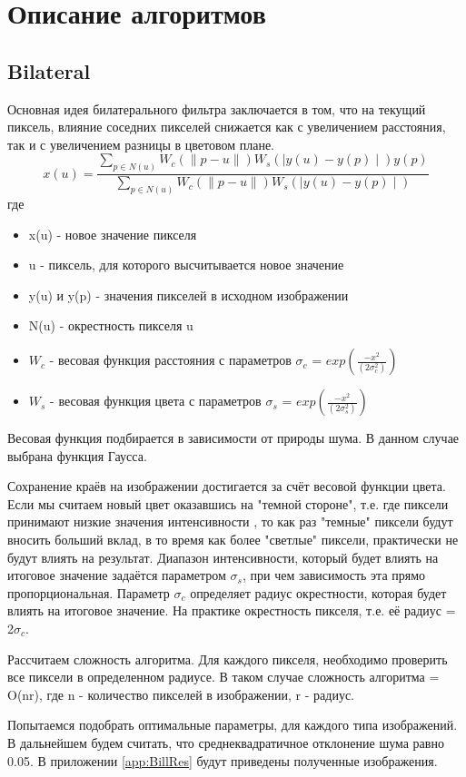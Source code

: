 \section{Описание алгоритмов}
\subsection{Bilateral}
Основная идея билатерального фильтра заключается в том, что на текущий пиксель, влияние соседних пикселей снижается как с
увеличением расстояния, так и с увеличением разницы в цветовом плане. 
\begin{equation}
x(u) = \frac{\sum_{p\in N(u)}W_c(\parallel p - u\parallel)W_s(\mid y(u) - y(p)\mid)y(p)}
{\sum_{p\in N(u)}W_c(\parallel p - u\parallel)W_s(\mid y(u) - y(p)\mid)}
\end{equation}
где
\begin{itemize}
\item x(u) - новое значение пикселя
\item u - пиксель, для которого высчитывается новое значение
\item y(u) и y(p) - значения пикселей в исходном изображении
\item N(u) - окрестность пикселя u
\item $W_c$ - весовая функция расстояния с параметров $\sigma_c$ = $exp(\frac{-x^2}{(2\sigma_c^2)})$
\item $W_s$ - весовая функция цвета с параметров $\sigma_s$ = $exp(\frac{-x^2}{(2\sigma_s^2)})$
\end{itemize}

Весовая функция подбирается в зависимости от природы шума. В данном случае выбрана функция Гаусса.

Сохранение краёв на изображении достигается за счёт весовой функции цвета. Если мы считаем новый цвет оказавшись на "темной стороне", т.е. где пиксели принимают низкие значения интенсивности , то как раз "темные" пиксели будут вносить больший вклад, в то время как более "светлые" пиксели, практически не будут влиять на результат. Диапазон интенсивности, который будет влиять на итоговое значение задаётся параметром $\sigma_s$,  при чем зависимость эта прямо пропорциональная.
Параметр $\sigma_c$ определяет радиус окрестности, которая будет влиять на итоговое значение. На практике окрестность пикселя, т.е. её радиус = 2$\sigma_c$.

Рассчитаем сложность алгоритма. Для каждого пикселя, необходимо проверить все пиксели в определенном радиусе. В таком случае сложность алгоритма = O(nr), где n - количество пикселей в изображении, r - радиус. 

Попытаемся подобрать оптимальные параметры, для каждого типа изображений. В дальнейшем будем считать, что среднеквадратичное отклонение шума равно 0.05.
В приложении \ref{app:BillRes} будут приведены полученные изображения. 